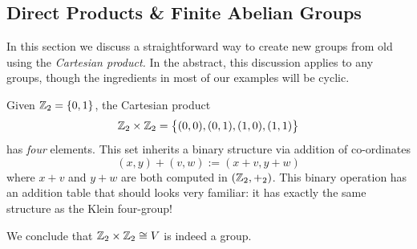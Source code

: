 \begin{exercises}
\begin{enumerate}
	
	\end{enumerate}
\end{exercises}



\subsection{Direct Products \& Finite Abelian Groups}\label{sec:direct}


In this section we discuss a straightforward way to create new groups from old using the \emph{Cartesian product.} In the abstract, this discussion applies to any groups, though the ingredients in most of our examples will be cyclic.

\begin{example}{}{}
	Given $\mathbb{Z}_2=\{0,1\}$, the Cartesian product
	\[
		\mathbb{Z}_2\times \mathbb{Z}_2=\bigl\{(0,0),(0,1),(1,0),(1,1)\bigr\}
	\]
	has \emph{four} elements. This set inherits a binary structure via addition of co-ordinates
	\[
		(x,y)+(v,w):=(x+v,y+w)
	\]
	where $x+v$ and $y+w$ are both computed in $(\mathbb{Z}_2,+_2)$. This binary operation has an addition table that should looks very familiar: it has exactly the same structure as the Klein four-group!
	\begin{quote}
		\qquad\scalebox{1.5}{$\leftrightsquigarrow$}\qquad
	\end{quote}
	We conclude that $\mathbb{Z}_2\times\mathbb{Z}_2\cong V$ is indeed a group.
\end{example}


